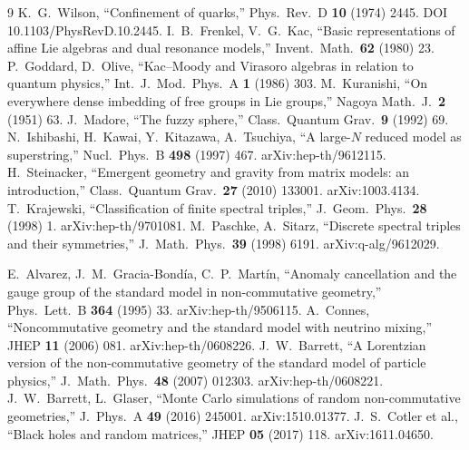 \documentclass[12pt,a4paper,twoside]{article}
\theoremstyle{plain}
\theoremstyle{definition}
\theoremstyle{remark}
\begin{document}
\begin{thebibliography}{9}
K.~G.~Wilson, ``Confinement of quarks,'' Phys.\ Rev.\ D \textbf{10} (1974) 2445. DOI 10.1103/PhysRevD.10.2445.
I.~B.~Frenkel, V.~G.~Kac, ``Basic representations of affine Lie algebras and dual resonance models,'' Invent.\ Math.\ \textbf{62} (1980) 23.
P.~Goddard, D.~Olive, ``Kac--Moody and Virasoro algebras in relation to quantum physics,'' Int.\ J.\ Mod.\ Phys.\ A \textbf{1} (1986) 303.
M.~Kuranishi, ``On everywhere dense imbedding of free groups in Lie groups,'' Nagoya Math.\ J.\ \textbf{2} (1951) 63.
J.~Madore, ``The fuzzy sphere,'' Class.\ Quantum Grav.\ \textbf{9} (1992) 69.
N.~Ishibashi, H.~Kawai, Y.~Kitazawa, A.~Tsuchiya, ``A large-$N$ reduced model as superstring,'' Nucl.\ Phys.\ B \textbf{498} (1997) 467. arXiv:hep-th/9612115.
H.~Steinacker, ``Emergent geometry and gravity from matrix models: an introduction,'' Class.\ Quantum Grav.\ \textbf{27} (2010) 133001. arXiv:1003.4134.
T.~Krajewski, ``Classification of finite spectral triples,'' J.\ Geom.\ Phys.\ \textbf{28} (1998) 1. arXiv:hep-th/9701081.
M.~Paschke, A.~Sitarz, ``Discrete spectral triples and their symmetries,'' J.\ Math.\ Phys.\ \textbf{39} (1998) 6191. arXiv:q-alg/9612029.

E.~Alvarez, J.~M.~Gracia-Bond\'ia, C.~P.~Mart\'in, ``Anomaly cancellation and the gauge group of the standard model in non-commutative geometry,'' Phys.\ Lett.\ B \textbf{364} (1995) 33. arXiv:hep-th/9506115.
A.~Connes, ``Noncommutative geometry and the standard model with neutrino mixing,'' JHEP \textbf{11} (2006) 081. arXiv:hep-th/0608226.
J.~W.~Barrett, ``A Lorentzian version of the non-commutative geometry of the standard model of particle physics,'' J.\ Math.\ Phys.\ \textbf{48} (2007) 012303. arXiv:hep-th/0608221.
J.~W.~Barrett, L.~Glaser, ``Monte Carlo simulations of random non-commutative geometries,'' J.\ Phys.\ A \textbf{49} (2016) 245001. arXiv:1510.01377.
J.~S.~Cotler et al., ``Black holes and random matrices,'' JHEP \textbf{05} (2017) 118. arXiv:1611.04650.


\end{thebibliography}
\end{document}
